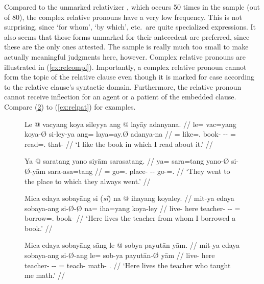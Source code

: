 Compared to the unmarked relativizer , which occurs 50 times in
the sample (out of 80), the complex relative pronouns have a very low
frequency. This is not surprising, since `for whom', `by which', etc.\ are
quite specialized expressions. It also seems that those forms unmarked for
their antecedent are preferred, since these are the only ones attested. The
sample is really much too small to make actually meaningful judgments here,
however. Complex relative pronouns are illustrated in (\ref{ex:relcompl}).
Importantly, a complex relative pronoun cannot form the topic of the relative
clause even though it is marked for case according to the relative clause's
syntactic domain. Furthermore, the relative pronoun cannot receive inflection
for an agent or a patient of the embedded clause. Compare (\ref{ex:reltop}) to
(\ref{ex:relpat}) for examples.

\begin{figure}
\pex\label{ex:relcompl}
\a\begingl[glspace=.33em]
	\gla Le @ vacyang koya sileyya ang @ layāy adanyana. //
	\glb le= vac=yang koya-Ø si-ley-ya ang= laya=ay.Ø adanya-na //
	\glc \PatTI{}= like=\Fsg{}.\Aarg{} book-\Top{} \Rel{}-\PargI{}-\Loc{}
	\AgtT{}= read=\Fsg{}.\Top{} that-\Gen{} //
	\glft `I like the book in which I read about it.' //
\endgl

\a\label{ex:reldat}\begingl
	\gla Ya @ saratang yano siyām sarasatang. //
	\glb ya= sara=tang yano-Ø si-Ø-yām sara-asa=tang //
	\glc \LocT{}= go=\TplM{}.\Aarg{} place-\Top{} \Rel{}-\Loc{}-\Dat{} 
		go-\Hab{}=\TplM{}.\Aarg{} //
	\glft `They went to the place to which they always went.' //
\endgl
\xe
\end{figure}

\begin{figure}
\ex\label{ex:reltop}
\ljudge* \begingl
	\gla Mica edaya sobayāng {si \textup{(\ques{}\textit{sī})}} na @ ihayang 
		koyaley. //
	\glb mit-ya edaya sobaya-ang si-Ø-Ø na= iha=yang koya-ley //
	\glc live-\TsgM{} here teacher-\Aarg{} \Rel{}-\Aarg{}-\Top{} \GenT{}= 
		borrow=\Fsg{}.\Aarg{} book-\PargI{} //
% 
	\glft `Here lives the teacher from whom I borrowed a book.' //
\endgl
\xe
\end{figure}

\begin{figure}
\ex\label{ex:relagt}
\ljudge* \begingl
	\gla Mica edaya sobayāng sāng le @ sobya payutān yām. //
	\glb mit-ya edaya sobaya-ang si-Ø-ang le= sob-ya payutān-Ø yām //
	\glc live-\TsgM{} here teacher-\Aarg{} \Rel{}-\Aarg{}-\Aarg{} \PatTI{}= 
		teach-\TsgM{} math-\Top{} \Fsg{}.\Dat{} //
% 
	\glft `Here lives the teacher who taught me math.' //
\endgl
\xe
\end{figure}

